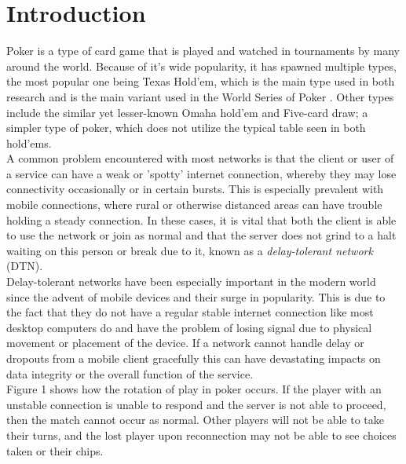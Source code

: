 \documentclass[11pt]{article}
\begin{document}
\tableofcontents



\newpage




\section{Introduction}
Poker is a type of card game that is played and watched in tournaments by many around the world. Because of it's wide popularity, it has spawned multiple types, the most popular one being Texas Hold'em, which is the main type used in both research \cite{research_texas} and is the main variant used in the World Series of Poker \cite{wsop_texas}. Other types include the similar yet lesser-known Omaha hold'em and Five-card draw; a simpler type of poker, which does not utilize the typical table seen in both hold'ems. \\

A common problem encountered with most networks is that the client or user of a service can have a weak or 'spotty' internet connection, whereby they may lose connectivity occasionally or in certain bursts. This is especially prevalent with mobile connections, where rural or otherwise distanced areas can have trouble holding a steady connection. In these cases, it is vital that both the client is able to use the network or join as normal and that the server does not grind to a halt waiting on this person or break due to it, known as a \textit{delay-tolerant network} (DTN). \\

Delay-tolerant networks have been especially important in the modern world since the advent of mobile devices and their surge in popularity. This is due to the fact that they do not have a regular stable internet connection like most desktop computers do and have the problem of losing signal due to physical movement or placement of the device. If a network cannot handle delay or dropouts from a mobile client gracefully this can have devastating impacts on data integrity or the overall function of the service. \\

Figure 1 shows how the rotation of play in poker occurs. If the player with an unstable connection is unable to respond and the server is not able to proceed, then the match cannot occur as normal. Other players will not be able to take their turns, and the lost player upon reconnection may not be able to see choices taken or their chips.
\end{document}
